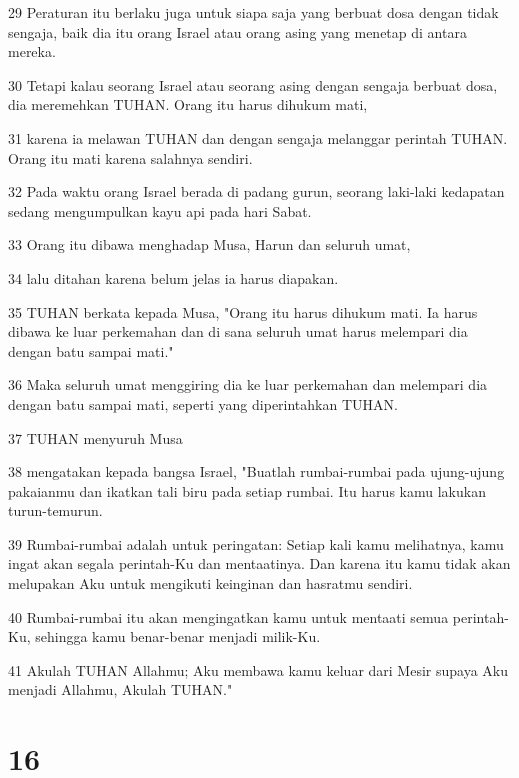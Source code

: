 \par 29 Peraturan itu berlaku juga untuk siapa saja yang berbuat dosa dengan tidak sengaja, baik dia itu orang Israel atau orang asing yang menetap di antara mereka.
\par 30 Tetapi kalau seorang Israel atau seorang asing dengan sengaja berbuat dosa, dia meremehkan TUHAN. Orang itu harus dihukum mati,
\par 31 karena ia melawan TUHAN dan dengan sengaja melanggar perintah TUHAN. Orang itu mati karena salahnya sendiri.
\par 32 Pada waktu orang Israel berada di padang gurun, seorang laki-laki kedapatan sedang mengumpulkan kayu api pada hari Sabat.
\par 33 Orang itu dibawa menghadap Musa, Harun dan seluruh umat,
\par 34 lalu ditahan karena belum jelas ia harus diapakan.
\par 35 TUHAN berkata kepada Musa, "Orang itu harus dihukum mati. Ia harus dibawa ke luar perkemahan dan di sana seluruh umat harus melempari dia dengan batu sampai mati."
\par 36 Maka seluruh umat menggiring dia ke luar perkemahan dan melempari dia dengan batu sampai mati, seperti yang diperintahkan TUHAN.
\par 37 TUHAN menyuruh Musa
\par 38 mengatakan kepada bangsa Israel, "Buatlah rumbai-rumbai pada ujung-ujung pakaianmu dan ikatkan tali biru pada setiap rumbai. Itu harus kamu lakukan turun-temurun.
\par 39 Rumbai-rumbai adalah untuk peringatan: Setiap kali kamu melihatnya, kamu ingat akan segala perintah-Ku dan mentaatinya. Dan karena itu kamu tidak akan melupakan Aku untuk mengikuti keinginan dan hasratmu sendiri.
\par 40 Rumbai-rumbai itu akan mengingatkan kamu untuk mentaati semua perintah-Ku, sehingga kamu benar-benar menjadi milik-Ku.
\par 41 Akulah TUHAN Allahmu; Aku membawa kamu keluar dari Mesir supaya Aku menjadi Allahmu, Akulah TUHAN."

\chapter{16}

